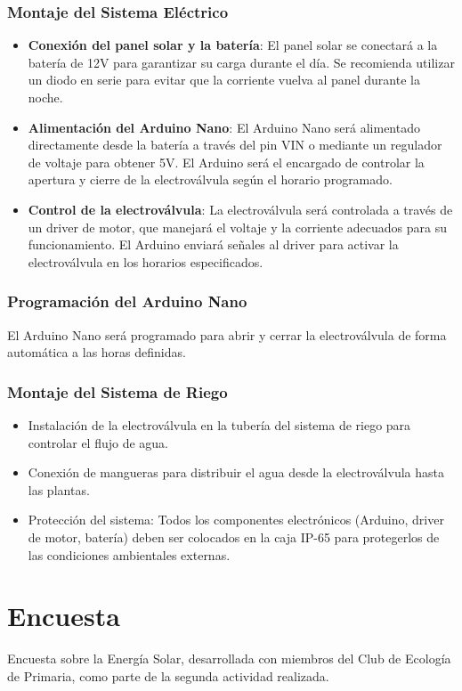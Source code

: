 \documentclass[12pt]{article}
\begin{document}
\subsubsection{Montaje del Sistema Eléctrico}
\begin{itemize}
      \item \textbf{Conexión del panel solar y la batería}: El panel solar se conectará a la batería de 12V para garantizar su carga durante el día. Se recomienda utilizar un diodo en serie para evitar que la corriente vuelva al panel durante la noche.
      \item \textbf{Alimentación del Arduino Nano}: El Arduino Nano será alimentado directamente desde la batería a través del pin VIN o mediante un regulador de voltaje para obtener 5V. El Arduino será el encargado de controlar la apertura y cierre de la electroválvula según el horario programado.
      \item \textbf{Control de la electroválvula}: La electroválvula será controlada a través de un driver de motor, que manejará el voltaje y la corriente adecuados para su funcionamiento. El Arduino enviará señales al driver para activar la electroválvula en los horarios especificados.
\end{itemize}

\subsubsection{Programación del Arduino Nano}
El Arduino Nano será programado para abrir y cerrar la electroválvula de forma automática a las horas definidas.

\subsubsection{Montaje del Sistema de Riego}
\begin{itemize}
      \item Instalación de la electroválvula en la tubería del sistema de riego para controlar el flujo de agua.
      \item Conexión de mangueras para distribuir el agua desde la electroválvula hasta las plantas.
      \item Protección del sistema: Todos los componentes electrónicos (Arduino, driver de motor, batería) deben ser colocados en la caja IP-65 para protegerlos de las condiciones ambientales externas.
\end{itemize}
\newpage
\section{Encuesta}
Encuesta sobre la Energía Solar, desarrollada con miembros del Club de Ecología de Primaria, como parte de la segunda actividad realizada.
\end{document}
